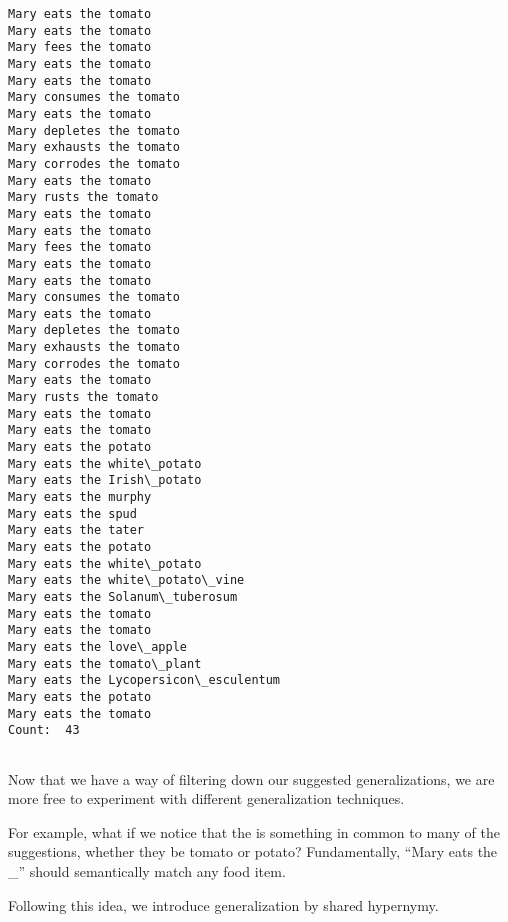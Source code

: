 \documentclass[11pt]{article}
\begin{document}
    \begin{Verbatim}[commandchars=\\\{\}]
Mary eats the tomato
Mary eats the tomato
Mary fees the tomato
Mary eats the tomato
Mary eats the tomato
Mary consumes the tomato
Mary eats the tomato
Mary depletes the tomato
Mary exhausts the tomato
Mary corrodes the tomato
Mary eats the tomato
Mary rusts the tomato
Mary eats the tomato
Mary eats the tomato
Mary fees the tomato
Mary eats the tomato
Mary eats the tomato
Mary consumes the tomato
Mary eats the tomato
Mary depletes the tomato
Mary exhausts the tomato
Mary corrodes the tomato
Mary eats the tomato
Mary rusts the tomato
Mary eats the tomato
Mary eats the tomato
Mary eats the potato
Mary eats the white\_potato
Mary eats the Irish\_potato
Mary eats the murphy
Mary eats the spud
Mary eats the tater
Mary eats the potato
Mary eats the white\_potato
Mary eats the white\_potato\_vine
Mary eats the Solanum\_tuberosum
Mary eats the tomato
Mary eats the tomato
Mary eats the love\_apple
Mary eats the tomato\_plant
Mary eats the Lycopersicon\_esculentum
Mary eats the potato
Mary eats the tomato
Count:  43 


    \end{Verbatim}

    Now that we have a way of filtering down our suggested generalizations,
we are more free to experiment with different generalization techniques.

For example, what if we notice that the is something in common to many
of the suggestions, whether they be tomato or potato? Fundamentally,
``Mary eats the \_'' should semantically match any food item.

Following this idea, we introduce generalization by shared hypernymy.
\end{document}
